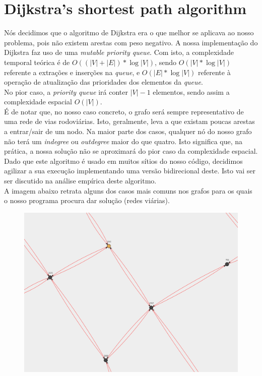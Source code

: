 \documentclass{report}
\begin{document}
  \section{Dijkstra's shortest path algorithm\cite{DIJKSTRA}}
    Nós decidimos que o algoritmo de Dijkstra\cite{DIJKSTRA} era o que melhor
    se aplicava ao nosso problema, pois não existem arestas com peso negativo.
    A nossa implementação do Dijkstra\cite{DIJKSTRA} faz uso de uma
    \textit{mutable priority queue}. Com isto, a complexidade temporal teórica
    é de $O((|V| + |E|) * \log|V|)$, sendo $O(|V| * \log|V|)$ referente a
    extrações e inserções na \textit{queue}, e $O(|E| * \log|V|)$ referente
    à operação de atualização das prioridades dos elementos da \textit{queue}.\\
    No pior caso, a \textit{priority queue} irá conter $|V| - 1$ elementos,
    sendo assim a complexidade espacial $O(|V|)$.\\
    \newline
    É de notar que, no nosso caso concreto, o grafo será sempre representativo
    de uma rede de vias rodoviárias. Isto, geralmente, leva a que existam poucas
    arestas a entrar/sair de um nodo. Na maior parte dos casos, qualquer nó
    do nosso grafo não terá um \textit{indegree} ou \textit{outdegree} maior
    do que quatro. Isto significa que, na prática, a nossa solução não se
    aproximará do pior caso da complexidade espacial.\\
    \newline
    Dado que este algoritmo é usado em muitos sítios do nosso código,
    decidimos agilizar a sua execução implementando uma versão bidirecional
    deste. Isto vai ser ser discutido na análise empírica deste algoritmo.\\
    \newpage
    A imagem abaixo retrata alguns dos casos mais comuns nos grafos
    para os quais o nosso programa procura dar solução (redes viárias).
    \begin{figure}[H]
      \centering
      \includegraphics[width=1.0\textwidth]{img/ex_space_dijk.png}
    \end{figure}
\end{document}

